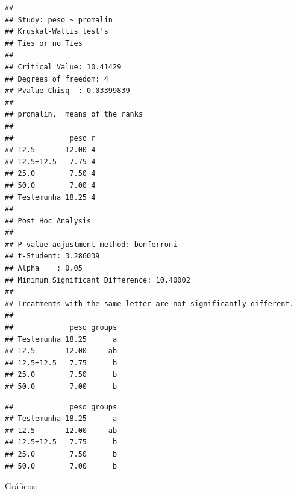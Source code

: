 \documentclass[
]{book}
\newenvironment{Shaded}{\begin{snugshade}}{\end{snugshade}}
\newcommand{\DataTypeTok}[1]{\textcolor[rgb]{0.13,0.29,0.53}{#1}}
\newcommand{\DecValTok}[1]{\textcolor[rgb]{0.00,0.00,0.81}{#1}}
\newcommand{\FloatTok}[1]{\textcolor[rgb]{0.00,0.00,0.81}{#1}}
\newcommand{\KeywordTok}[1]{\textcolor[rgb]{0.13,0.29,0.53}{\textbf{#1}}}
\newcommand{\NormalTok}[1]{#1}
\newcommand{\OperatorTok}[1]{\textcolor[rgb]{0.81,0.36,0.00}{\textbf{#1}}}
\newcommand{\OtherTok}[1]{\textcolor[rgb]{0.56,0.35,0.01}{#1}}
\newcommand{\StringTok}[1]{\textcolor[rgb]{0.31,0.60,0.02}{#1}}
\begin{document}
\begin{verbatim}
## 
## Study: peso ~ promalin
## Kruskal-Wallis test's
## Ties or no Ties
## 
## Critical Value: 10.41429
## Degrees of freedom: 4
## Pvalue Chisq  : 0.03399839 
## 
## promalin,  means of the ranks
## 
##             peso r
## 12.5       12.00 4
## 12.5+12.5   7.75 4
## 25.0        7.50 4
## 50.0        7.00 4
## Testemunha 18.25 4
## 
## Post Hoc Analysis
## 
## P value adjustment method: bonferroni
## t-Student: 3.286039
## Alpha    : 0.05
## Minimum Significant Difference: 10.40002 
## 
## Treatments with the same letter are not significantly different.
## 
##             peso groups
## Testemunha 18.25      a
## 12.5       12.00     ab
## 12.5+12.5   7.75      b
## 25.0        7.50      b
## 50.0        7.00      b
\end{verbatim}

\begin{Shaded}
\end{Shaded}

\begin{verbatim}
##             peso groups
## Testemunha 18.25      a
## 12.5       12.00     ab
## 12.5+12.5   7.75      b
## 25.0        7.50      b
## 50.0        7.00      b
\end{verbatim}

Gráficos:

\begin{Shaded}
\end{Shaded}
\end{document}
